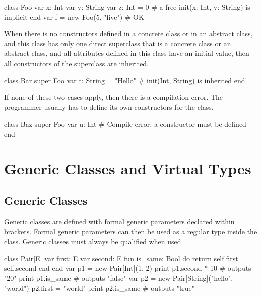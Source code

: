 \begin{lst}
class Foo
	var x: Int
	var y: String
	var z: Int = 0
	# a free init(x: Int, y: String) is implicit
end
var f = new Foo(5, "five") # OK
\end{lst}

When there is no constructors defined in a concrete class or in an abstract class, and this class has only one direct superclass that is a concrete class or an abstract class, and all attributes defined in this class have an initial value, then all constructors of the superclass are inherited.

\begin{lst}
class Bar
	super Foo
	var t: String = "Hello"
	# init(Int, String) is inherited
end
\end{lst}

If none of these two cases apply, then there is a compilation error.
The programmer usually has to define its own constructors for the class.

\begin{lst}
class Baz
	super Foo
	var u: Int
	# Compile error: a constructor must be defined
end
\end{lst}

\section{Generic Classes and Virtual Types}

\subsection{Generic Classes}\label{generic}

Generic classes are defined with formal generic parameters declared within brackets.
Formal generic parameters can then be used as a regular type inside the class.
Generic classes must always be qualified when used.

\begin{lst}
class Pair[E]
	var first: E
	var second: E
	fun is_same: Bool
	do
		return self.first == self.second
	end
end
var p1 = new Pair[Int](1, 2)
print p1.second * 10 # outputs "20"
print p1.is_same # outputs "false"
var p2 = new Pair[String]("hello", "world")
p2.first = "world"
print p2.is_same # outputs "true"
\end{lst}

